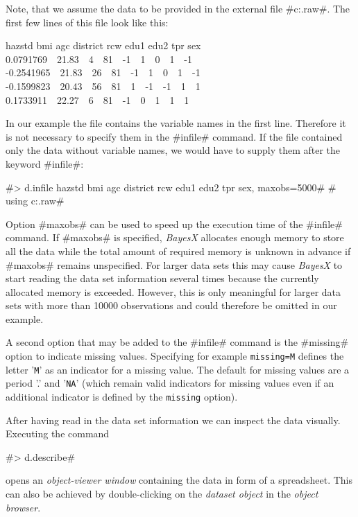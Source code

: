 Note, that we assume the data to be provided in the external file
#c:\data\zambia.raw#. The first few lines of this file look like
this:

{\footnotesize
 hazstd bmi agc district rcw edu1 edu2 tpr sex\\
 0.0791769 \,\, 21.83 \,\, 4 \,\, 81 \,\, -1 \,\, 1 \,\, 0 \,\, 1 \,\, -1\\
 -0.2541965 \,\, 21.83 \,\, 26 \,\, 81 \,\, -1 \,\, 1 \,\, 0 \,\, 1 \,\, -1\\
 -0.1599823 \,\, 20.43 \,\, 56 \,\, 81 \,\, 1 \,\, -1 \,\, -1 \,\, 1 \,\, 1\\
 0.1733911 \,\, 22.27 \,\, 6 \,\, 81 \,\, -1 \,\, 0 \,\, 1 \,\, 1 \,\, 1}

In our example the file contains the variable names in the first
line. Therefore it is not necessary to specify them in the
#infile# command. If the file contained only the data without
variable names, we would have to supply them after the keyword
#infile#:

 #> d.infile hazstd bmi agc district rcw edu1 edu2 tpr sex, maxobs=5000#
 #  using c:\data\zambia.raw#


Option #maxobs# can be used to speed up the execution time of the
#infile# command. If #maxobs# is specified, {\it BayesX} allocates
enough memory to store all the data while the total amount of
required memory is unknown in advance if #maxobs# remains
unspecified. For larger data sets this may cause {\it BayesX} to
start reading the data set information several times because the
currently allocated memory is exceeded. However, this is only
meaningful for larger data sets with more than 10000 observations
and could therefore be omitted in our example.

A second option that may be added to the #infile# command is the
#missing# option to indicate missing values. Specifying for
example {\tt missing=M} defines the letter '{\tt M}' as an
indicator for a missing value. The default for missing values are
a period '.' and '{\tt NA}' (which remain valid indicators for
missing values even if an additional indicator is defined by the
{\tt missing} option).

After having read in the data set information we can inspect the
data visually. Executing the command

#> d.describe#

opens an {\it object-viewer window} containing the data in form of
a spreadsheet. This can also be achieved by double-clicking on the
{\it dataset object} in the {\it object browser}.

